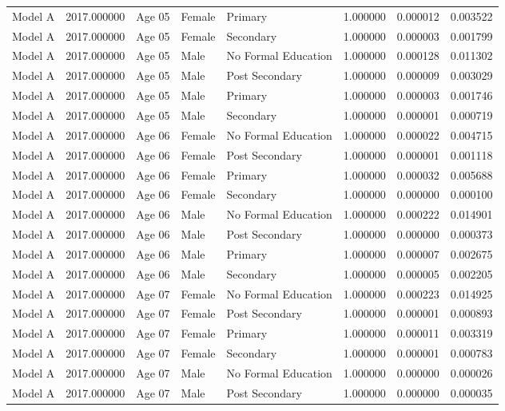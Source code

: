 \begin{table}[ht]
\begin{tabular}{lrlllrrr}
Model A & 2017.000000 & Age 05 & Female & Primary & 1.000000 & 0.000012 & 0.003522 \\
Model A & 2017.000000 & Age 05 & Female & Secondary & 1.000000 & 0.000003 & 0.001799 \\
Model A & 2017.000000 & Age 05 & Male & No Formal Education & 1.000000 & 0.000128 & 0.011302 \\
Model A & 2017.000000 & Age 05 & Male & Post Secondary & 1.000000 & 0.000009 & 0.003029 \\
Model A & 2017.000000 & Age 05 & Male & Primary & 1.000000 & 0.000003 & 0.001746 \\
Model A & 2017.000000 & Age 05 & Male & Secondary & 1.000000 & 0.000001 & 0.000719 \\
Model A & 2017.000000 & Age 06 & Female & No Formal Education & 1.000000 & 0.000022 & 0.004715 \\
Model A & 2017.000000 & Age 06 & Female & Post Secondary & 1.000000 & 0.000001 & 0.001118 \\
Model A & 2017.000000 & Age 06 & Female & Primary & 1.000000 & 0.000032 & 0.005688 \\
Model A & 2017.000000 & Age 06 & Female & Secondary & 1.000000 & 0.000000 & 0.000100 \\
Model A & 2017.000000 & Age 06 & Male & No Formal Education & 1.000000 & 0.000222 & 0.014901 \\
Model A & 2017.000000 & Age 06 & Male & Post Secondary & 1.000000 & 0.000000 & 0.000373 \\
Model A & 2017.000000 & Age 06 & Male & Primary & 1.000000 & 0.000007 & 0.002675 \\
Model A & 2017.000000 & Age 06 & Male & Secondary & 1.000000 & 0.000005 & 0.002205 \\
Model A & 2017.000000 & Age 07 & Female & No Formal Education & 1.000000 & 0.000223 & 0.014925 \\
Model A & 2017.000000 & Age 07 & Female & Post Secondary & 1.000000 & 0.000001 & 0.000893 \\
Model A & 2017.000000 & Age 07 & Female & Primary & 1.000000 & 0.000011 & 0.003319 \\
Model A & 2017.000000 & Age 07 & Female & Secondary & 1.000000 & 0.000001 & 0.000783 \\
Model A & 2017.000000 & Age 07 & Male & No Formal Education & 1.000000 & 0.000000 & 0.000026 \\
Model A & 2017.000000 & Age 07 & Male & Post Secondary & 1.000000 & 0.000000 & 0.000035 \\

\end{tabular}
\end{table}
